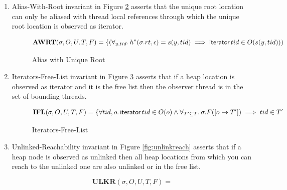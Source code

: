 \begin{enumerate}
\begin{figure}[!htb]
\[
\textbf{RWOW}(\sigma,O,U,T,F)=
\left\{
\begin{array}{ll}
	 \forall x,tid,o \ldotp \sigma.s(x,tid) = o  
         \land (x,tid) \notin U \implies \\ \left\{
		\begin{array}{ll}
 			& \textsf{iterator } \, tid \in O(o) \\
 		  & \lor (\sigma.l=tid \land (\textsf{unlinked} \in O(o) ) \\
		  & \lor (\sigma.l=tid  \land \textsf{freeable} \in O(o)))  \\
       & \lor (\sigma.l=tid \land \textsf{fresh} \in O(o))     
		\end{array}
	\right.%
\end{array}
\right.%
\]
\caption{Reader-Writer-Iterator-Coexistence-Ownership}
\label{fig:rwitrexistence}
\end{figure}
\item{Alias-With-Root} invariant in Figure \ref{fig:aliaswithroot} asserts that the unique root location can only be aliased with thread local references through which the unique root location is observed as \textsf{iterator}.
\begin{figure}[!htb]
\[
\textbf{AWRT}(\sigma,O,U,T,F)=
\left\{
(\forall_{y,tid} \ldotp h^{*}(\sigma.rt,\epsilon) = s(y,tid)  \implies \textsf{iterator}\, tid \in O(s(y,tid)))
	\right.%
\]
\caption{Alias with Unique Root}
\label{fig:aliaswithroot}
\end{figure}
\item{Iterators-Free-List} invariant in Figure \ref{fig:itrfreelist} asserts that if a heap location is observed as \textsf{iterator} and it is the free list then the observer thread is in the set of bounding threads.
\begin{figure}[!htb]
\[
\textbf{IFL}(\sigma,O,U,T,F)=
\left\{
	\forall tid, o \ldotp  \textsf{iterator} \, tid \in O(o)  \land \forall_{T'\subseteq T} \ldotp \sigma.F([o \mapsto T'])  \implies tid \in T' 
\right.%
\]
\caption{Iterators-Free-List}
\label{fig:itrfreelist}
\end{figure}
\item{Unlinked-Reachability} invariant in Figure \ref{fig:unlinkreach} asserts that if a heap node is observed as \textsf{unlinked} then all heap locations from which you can reach to the \textsf{unlinked} one are also unlinked or in the free list.
\begin{figure}[!htb]
\[
\textbf{ULKR}(\sigma,O,U,T,F) =
\]
\end{figure}
\end{enumerate}
